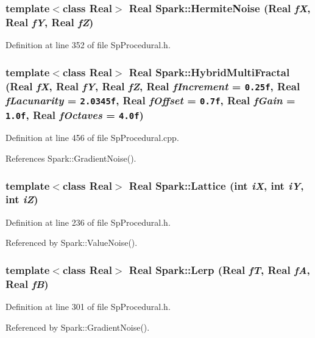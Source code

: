 \subsubsection{\setlength{\rightskip}{0pt plus 5cm}template$<$class Real$>$ Real Spark::Hermite\-Noise (Real {\em f\-X}, Real {\em f\-Y}, Real {\em f\-Z})}\label{namespaceSpark_a108}


Definition at line 352 of file Sp\-Procedural.h.
\subsubsection{\setlength{\rightskip}{0pt plus 5cm}template$<$class Real$>$ Real Spark::Hybrid\-Multi\-Fractal (Real {\em f\-X}, Real {\em f\-Y}, Real {\em f\-Z}, Real {\em f\-Increment} = {\tt 0.25f}, Real {\em f\-Lacunarity} = {\tt 2.0345f}, Real {\em f\-Offset} = {\tt 0.7f}, Real {\em f\-Gain} = {\tt 1.0f}, Real {\em f\-Octaves} = {\tt 4.0f})}\label{namespaceSpark_a80}


Definition at line 456 of file Sp\-Procedural.cpp.

References Spark::Gradient\-Noise().
\subsubsection{\setlength{\rightskip}{0pt plus 5cm}template$<$class Real$>$ Real Spark::Lattice (int {\em i\-X}, int {\em i\-Y}, int {\em i\-Z})}\label{namespaceSpark_a94}


Definition at line 236 of file Sp\-Procedural.h.

Referenced by Spark::Value\-Noise().
\subsubsection{\setlength{\rightskip}{0pt plus 5cm}template$<$class Real$>$ Real Spark::Lerp (Real {\em f\-T}, Real {\em f\-A}, Real {\em f\-B})}\label{namespaceSpark_a100}


Definition at line 301 of file Sp\-Procedural.h.

Referenced by Spark::Gradient\-Noise().
